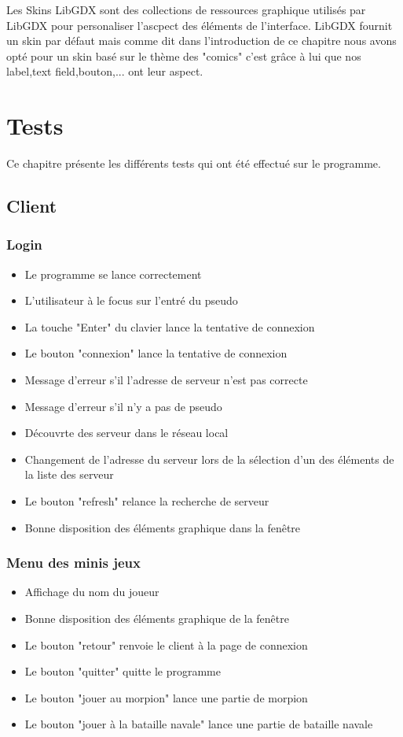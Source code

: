 \documentclass{report}
\begin{document}
Les Skins LibGDX sont des collections de ressources graphique utilisés par LibGDX pour personaliser l'ascpect des éléments
de l'interface. LibGDX fournit un skin par défaut mais comme dit dans l'introduction de ce chapitre nous avons opté pour un skin
basé sur le thème des "comics" c'est grâce à lui que nos label,text field,bouton,... ont leur aspect.

\chapter{Tests}
Ce chapitre présente les différents tests qui ont été effectué sur le programme.
\section{Client}
\subsection{Login}
\begin{itemize}
  \item Le programme se lance correctement
  \item L'utilisateur à le focus sur l'entré du pseudo
  \item La touche "Enter" du clavier lance la tentative de connexion
  \item Le bouton "connexion" lance la tentative de connexion
  \item Message d'erreur s'il l'adresse de  serveur n'est pas correcte
  \item Message d'erreur s'il n'y a pas de pseudo
  \item Découvrte des serveur dans le réseau local
  \item Changement de l'adresse du serveur lors de la sélection d'un des éléments de la liste des serveur
  \item Le bouton "refresh" relance la recherche de serveur
  \item Bonne disposition des éléments graphique dans la fenêtre

\end{itemize}

\subsection{Menu des minis jeux}
\begin{itemize}
  \item Affichage du nom du joueur
  \item Bonne disposition des éléments graphique de la fenêtre
  \item Le bouton "retour" renvoie le client à la page de connexion
  \item Le bouton "quitter" quitte le programme
  \item Le bouton "jouer au morpion" lance une partie de morpion
  \item Le bouton "jouer à la bataille navale" lance une partie de bataille navale
\end{itemize}
\end{document}
